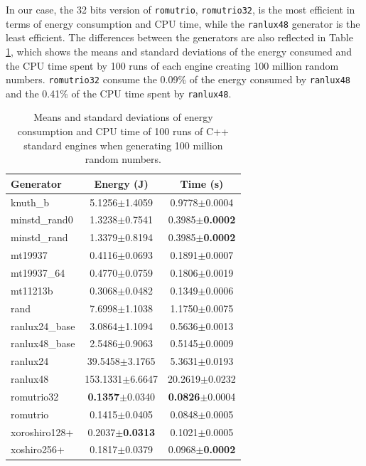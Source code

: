 \documentclass[dvipsnames,format=sigconf,anonymous=true,review=true]{acmart}
\begin{document}
In our case, the 32 bits version of \texttt{romutrio}, \texttt{romutrio32}, is the most efficient in terms of energy consumption and CPU time, while the \texttt{ranlux48} generator is the least efficient. The differences between the generators are also reflected in Table \ref{tab:pkg}, which shows the means and standard deviations of the energy consumed and the CPU time spent by 100 runs of each engine creating 100 million random numbers. \texttt{romutrio32} consume the 0.09\% of the energy consumed by \texttt{ranlux48} and the 0.41\% of the CPU time spent by \texttt{ranlux48}.

\begin{table}
\centering
\caption{Means and standard deviations of energy consumption and CPU time of 100 runs of C++ standard engines when generating 100 million random numbers.}
\begin{tabular}{lcc}
\toprule
Generator & Energy (J) & Time (s) \\
\midrule
knuth\_b & 5.1256$\pm$1.4059 & 0.9778$\pm$0.0004 \\
minstd\_rand0 & 1.3238$\pm$0.7541 & 0.3985$\pm$\textbf{0.0002} \\
minstd\_rand & 1.3379$\pm$0.8194 & 0.3985$\pm$\textbf{0.0002} \\
mt19937 & 0.4116$\pm$0.0693 & 0.1891$\pm$0.0007 \\
mt19937\_64 & 0.4770$\pm$0.0759 & 0.1806$\pm$0.0019 \\
mt11213b & 0.3068$\pm$0.0482 & 0.1349$\pm$0.0006 \\
rand & 7.6998$\pm$1.1038 & 1.1750$\pm$0.0075 \\
ranlux24\_base & 3.0864$\pm$1.1094 & 0.5636$\pm$0.0013 \\
ranlux48\_base & 2.5486$\pm$0.9063 & 0.5145$\pm$0.0009 \\
ranlux24 & 39.5458$\pm$3.1765 & 5.3631$\pm$0.0193 \\
ranlux48 & 153.1331$\pm$6.6647 & 20.2619$\pm$0.0232 \\
romutrio32 & \textbf{0.1357}$\pm$0.0340 & \textbf{0.0826}$\pm$0.0004 \\
romutrio & 0.1415$\pm$0.0405 & 0.0848$\pm$0.0005 \\
xoroshiro128+ & 0.2037$\pm$\textbf{0.0313} & 0.1021$\pm$0.0005 \\
xoshiro256+ & 0.1817$\pm$0.0379 & 0.0968$\pm$\textbf{0.0002} \\
\bottomrule
\end{tabular}
\label{tab:pkg}
\end{table}
\end{document}
